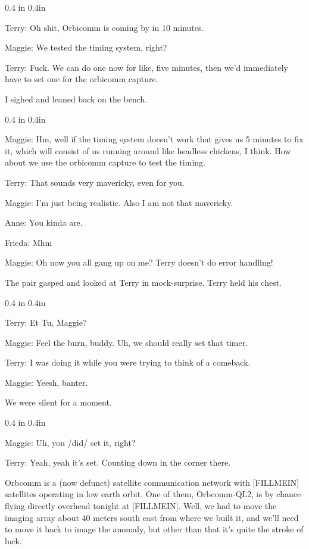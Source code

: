 \documentclass[a5paper,10pt]{book}
\newenvironment{dialogue}
{
\it
\renewcommand{\:}{\rm:}
\PushPreHook{par}{\it}

\begin{changemargin}{ 0.4 in}{ 0.4in}
\addtolength{\parskip}{0.1em}
}
{
\addtolength{\parskip}{-0.1em}
\end{changemargin}

\PopPreHook{par}
}
\begin{document}
\begin{dialogue}
  Terry\: Oh shit, Orbicomm is coming by in 10 minutes.

  Maggie\: We tested the timing system, right?

  Terry\: Fuck. We can do one now for like, five minutes, then we'd immediately have to set one for the orbicomm capture.
\end{dialogue}

I sighed and leaned back on the bench.

\begin{dialogue}
  Maggie\: Hm, well if the timing system doesn't work that gives us 5 minutes to fix it, which will consist of us running around like headless chickens, I think. How about we use the orbicomm capture to test the timing.

  Terry\: That sounds very mavericky, even for you.

  Maggie\: I'm just being realistic. Also I am not that mavericky.

  Anne\: You kinda are.

  Frieda\: Mhm

  Maggie\: Oh now you all gang up on me? Terry doesn't do error handling!
\end{dialogue}

The pair gasped and looked at Terry in mock-surprise. Terry held his chest.

\begin{dialogue}
  Terry\: Et Tu, Maggie?

  Maggie\: Feel the burn, buddy. Uh, we should really set that timer.

  Terry\: I was doing it while you were trying to think of a comeback.

  Maggie\: Yeesh, banter. 
\end{dialogue}

We were silent for a moment.

\begin{dialogue}
  Maggie\: Uh, you /did/ set it, right?

  Terry\: Yeah, yeah it's set. Counting down in the corner there.
\end{dialogue}

Orbcomm is a (now defunct) satellite communication network with [FILLMEIN] satellites operating in low earth orbit. One of them, Orbcomm-QL2, is by chance flying directly overhead tonight at [FILLMEIN]. Well, we had to move the imaging array about 40 meters south east from where we built it, and we'll need to move it back to image the anomaly, but other than that it's quite the stroke of luck.
\end{document}
